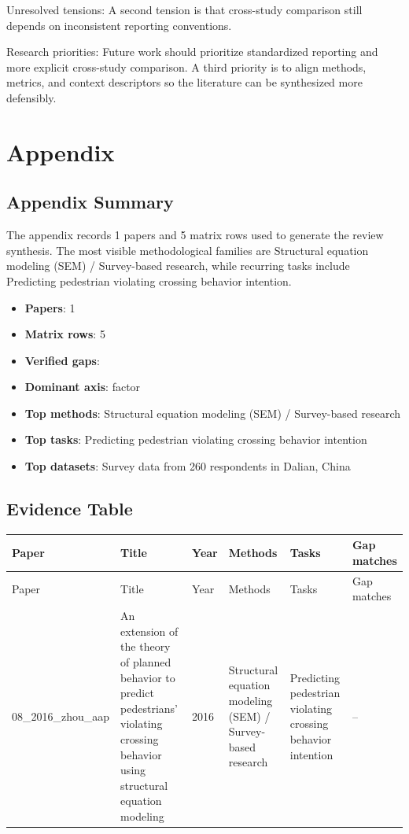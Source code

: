 \documentclass{article}
\begin{document}
Unresolved tensions: A second tension is that cross-study comparison still depends on inconsistent reporting conventions. \cite{08_2016_zhou_aap}

Research priorities: Future work should prioritize standardized reporting and more explicit cross-study comparison. A third priority is to align methods, metrics, and context descriptors so the literature can be synthesized more defensibly. \cite{08_2016_zhou_aap}

\appendix
\section{Appendix}
\subsection{Appendix Summary}
\noindent The appendix records 1 papers and 5 matrix rows used to generate the review synthesis. The most visible methodological families are Structural equation modeling (SEM) / Survey-based research, while recurring tasks include Predicting pedestrian violating crossing behavior intention.

\begin{itemize}
\item \textbf{Papers}: 1
\item \textbf{Matrix rows}: 5
\item \textbf{Verified gaps}: 
\item \textbf{Dominant axis}: factor
\item \textbf{Top methods}: Structural equation modeling (SEM) / Survey-based research
\item \textbf{Top tasks}: Predicting pedestrian violating crossing behavior intention
\item \textbf{Top datasets}: Survey data from 260 respondents in Dalian, China
\end{itemize}

\subsection{Evidence Table}
\begin{longtable}{p{}p{}p{}p{}p{}p{}}
\toprule
Paper & Title & Year & Methods & Tasks & Gap matches \\
\midrule
\endfirsthead
\toprule
Paper & Title & Year & Methods & Tasks & Gap matches \\
\midrule
\endhead
08\_2016\_zhou\_aap & An extension of the theory of planned behavior to predict pedestrians' violating crossing behavior using structural equation modeling & 2016 & Structural equation modeling (SEM) / Survey-based research & Predicting pedestrian violating crossing behavior intention & -- \\
\bottomrule
\end{longtable}
\end{document}
